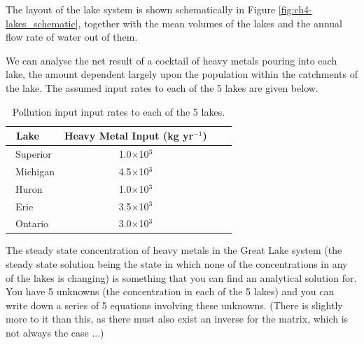 \documentclass{tufte-book} %
\begin{document}
The layout of the lake system is shown schematically in Figure \ref{fig:ch4-lakes_schematic}, together with the mean volumes of the lakes and the annual flow rate of water out of them.

We can analyse the net result of a cocktail of heavy metals pouring into each lake, the amount dependent largely upon the population within the catchments of the lake. The assumed input rates to each of the 5 lakes are given below.

\begin{table}[h]
\footnotesize%
\begin{center}
\begin{tabular}{lccl}
\toprule
\ Lake & Heavy Metal Input (kg yr\(^{-1}\)) \\
\midrule
\ Superior & 1.0\(\times\)10\(^{3}\) \\
\ Michigan & 4.5\(\times\)10\(^{3}\) \\
\ Huron & 1.0\(\times\)10\(^{3}\) \\
\ Erie & 3.5\(\times\)10\(^{3}\) \\
\ Ontario & 3.0\(\times\)10\(^{3}\) \\
\bottomrule
\end{tabular}
\end{center}
\caption{Pollution input input rates to each of the 5 lakes.}
\label{tab:ch4-laketable}
\end{table}

The steady state concentration of heavy metals in the Great Lake system (the steady state solution being the state in which none of the concentrations in any of the lakes is changing) is something that you can find an analytical solution for. You have 5 unknowns (the concentration in each of the 5 lakes) and you can write down a series of 5 equations involving these unknowns. (There is slightly more to it than this, as there must also exist an inverse for the matrix, which is not always the case ...)
\end{document}
